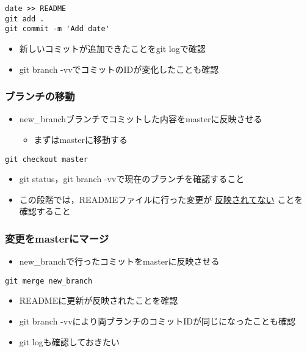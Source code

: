 \documentclass[a4paper,twoside,twocolumn]{bxjsarticle}
\begin{document}
\begin{verbatim}
date >> README
git add .
git commit -m 'Add date'
\end{verbatim}

\begin{itemize}
\item 新しいコミットが追加できたことをgit logで確認
\item git branch -vvでコミットのIDが変化したことも確認
\end{itemize}

\subsubsection{ブランチの移動}
\label{sec-1-6-6}
\begin{itemize}
\item new\_branchブランチでコミットした内容をmasterに反映させる
\begin{itemize}
\item まずはmasterに移動する
\end{itemize}
\end{itemize}

\begin{verbatim}
git checkout master
\end{verbatim}

\begin{itemize}
\item git status，git branch -vvで現在のブランチを確認すること
\item この段階では，READMEファイルに行った変更が \uline{反映されてない} ことを
確認すること
\end{itemize}

\subsubsection{変更をmasterにマージ}
\label{sec-1-6-7}
\begin{itemize}
\item new\_branchで行ったコミットをmasterに反映させる
\end{itemize}

\begin{verbatim}
git merge new_branch
\end{verbatim}

\begin{itemize}
\item READMEに更新が反映されたことを確認
\item git branch -vvにより両ブランチのコミットIDが同じになったことも確認
\item git logも確認しておきたい
\end{itemize}
\end{document}
